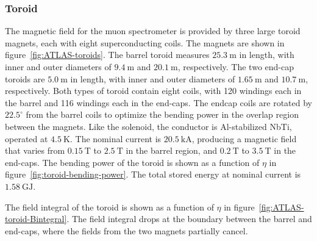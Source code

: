 \subsubsection{Toroid}\label{sec:ATLAS-magnets-toroid}

The magnetic field for the muon spectrometer is provided by three large toroid magnets, each with eight superconducting coils. The magnets are shown in figure~\ref{fig:ATLAS-toroids}. The barrel toroid measures $25.3~\mbox{m}$ in length, with inner and outer diameters of $9.4~\mbox{m}$ and $20.1~\mbox{m}$, respectively. The two end-cap toroids are $5.0~\mbox{m}$ in length, with inner and outer diameters of $1.65~\mbox{m}$ and $10.7~\mbox{m}$, respectively. Both types of toroid contain eight coils, with 120 windings each in the barrel and 116 windings each in the end-caps. The endcap coils are rotated by $22.5^{\circ}$ from the barrel coils to optimize the bending power in the overlap region between the magnets. Like the solenoid, the conductor is Al-stabilized NbTi, operated at $4.5~\mbox{K}$. The nominal current is $20.5~\mbox{kA}$, producing a magnetic field that varies from $0.15~\mbox{T}$ to $2.5~\mbox{T}$ in the barrel region, and $0.2~\mbox{T}$ to $3.5~\mbox{T}$ in the end-caps. The bending power of the toroid is shown as a function of $\eta$ in figure~\ref{fig:toroid-bending-power}. The total stored energy at nominal current is $1.58~\mbox{GJ}$. 

The field integral of the toroid is shown as a function of $\eta$ in figure~\ref{fig:ATLAS-toroid-Bintegral}. The field integral drops at the boundary between the barrel and end-caps, where the fields from the two magnets partially cancel. 


